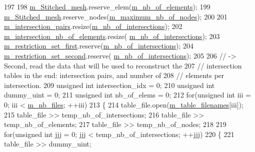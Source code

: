 \begin{DoxyCode}
197 
198     \hyperlink{classcarl_1_1_stitch___meshes_abebb40f413d1dbce1d74f9280e978ed7}{m\_Stitched\_mesh}.reserve\_elem(\hyperlink{classcarl_1_1_stitch___meshes_a4ed4ce7e9a185c3fd2bd92755888a37e}{m\_nb\_of\_elements});
199     \hyperlink{classcarl_1_1_stitch___meshes_abebb40f413d1dbce1d74f9280e978ed7}{m\_Stitched\_mesh}.reserve\_nodes(\hyperlink{classcarl_1_1_stitch___meshes_a5583a82a08d9560d4b7bf2c1c3c9b815}{m\_maximum\_nb\_of\_nodes});
200 
201     \hyperlink{classcarl_1_1_stitch___meshes_ac2d5619dc617ae411c3c97c130522e29}{m\_intersection\_pairs}.resize(\hyperlink{classcarl_1_1_stitch___meshes_a764e63989a934f87105b5f978ec999f1}{m\_nb\_of\_intersections});
202     \hyperlink{classcarl_1_1_stitch___meshes_a5548b4e0628dcdcb5b1c08eeec124c39}{m\_intersection\_nb\_of\_elements}.resize(
      \hyperlink{classcarl_1_1_stitch___meshes_a764e63989a934f87105b5f978ec999f1}{m\_nb\_of\_intersections});
203     \hyperlink{classcarl_1_1_stitch___meshes_a60ffa9c7303b4c3833d5a0df2ee5e7f5}{m\_restriction\_set\_first}.reserve(\hyperlink{classcarl_1_1_stitch___meshes_a764e63989a934f87105b5f978ec999f1}{m\_nb\_of\_intersections});
204     \hyperlink{classcarl_1_1_stitch___meshes_acb37d0d65327137309fa5b7815e4b71a}{m\_restriction\_set\_second}.reserve(
      \hyperlink{classcarl_1_1_stitch___meshes_a764e63989a934f87105b5f978ec999f1}{m\_nb\_of\_intersections});
205 
206     \textcolor{comment}{// -> Second, read the data that will be used to reconstruct the}
207     \textcolor{comment}{//    intersection tables in the end: intersection pairs, and number of}
208     \textcolor{comment}{//    elements per intersection.}
209     \textcolor{keywordtype}{unsigned} \textcolor{keywordtype}{int} intersection\_idx = 0;
210     \textcolor{keywordtype}{unsigned} \textcolor{keywordtype}{int} dummy\_uint = 0;
211     \textcolor{keywordtype}{unsigned} \textcolor{keywordtype}{int} nb\_of\_elems = 0;
212     \textcolor{keywordflow}{for}(\textcolor{keywordtype}{unsigned} \textcolor{keywordtype}{int} iii = 0; iii < \hyperlink{classcarl_1_1_stitch___meshes_a01c131c2e0c83ef1642326f6ea4f97d2}{m\_nb\_files}; ++iii)
213     \{
214         table\_file.open(\hyperlink{classcarl_1_1_stitch___meshes_a45f392e103d8b859857981971165dc0d}{m\_table\_filenames}[iii]);
215         table\_file >> temp\_nb\_of\_intersections;
216         table\_file >> temp\_nb\_of\_elements;
217         table\_file >> temp\_nb\_of\_nodes;
218 
219         \textcolor{keywordflow}{for}(\textcolor{keywordtype}{unsigned} \textcolor{keywordtype}{int} jjj = 0; jjj < temp\_nb\_of\_intersections; ++jjj)
220         \{
221             table\_file  >> dummy\_uint;

\end{DoxyCode}
